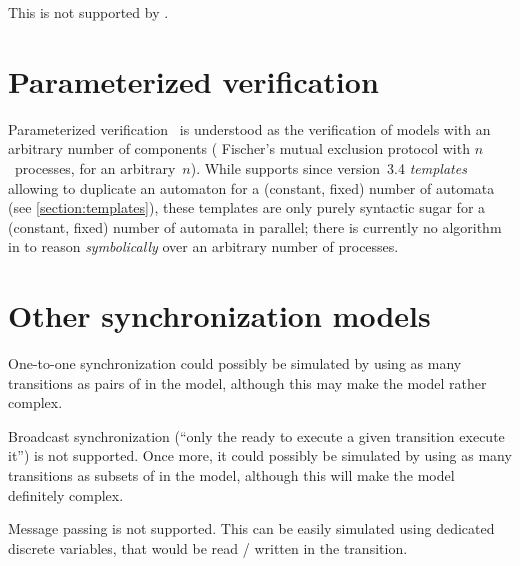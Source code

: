 This is not supported by \imitator{}. %



\section{Parameterized verification}

Parameterized verification~\cite{AD16} is understood as the verification of models with an arbitrary number of components (\eg{} Fischer's mutual exclusion protocol with $n$~processes, for an arbitrary~$n$).
While \imitator{} supports since version~3.4 \emph{templates} allowing to duplicate an automaton for a (constant, fixed) number of automata (see \cref{section:templates}), these templates are only purely syntactic sugar for a (constant, fixed) number of automata in parallel; there is currently no algorithm in \imitator{} to reason \emph{symbolically} over an arbitrary number of processes.





\section{Other synchronization models}

One-to-one synchronization could possibly be simulated by using as many transitions as pairs of \IPTA{} in the model, although this may make the model rather complex.



Broadcast synchronization (``only the \IPTA{} ready to execute a given transition execute it'') is not supported.
Once more, it could possibly be simulated by using as many transitions as subsets of \IPTA{} in the model, although this will make the model definitely complex.



Message passing is not supported.
This can be easily simulated using dedicated discrete variables, that would be read / written in the transition.

